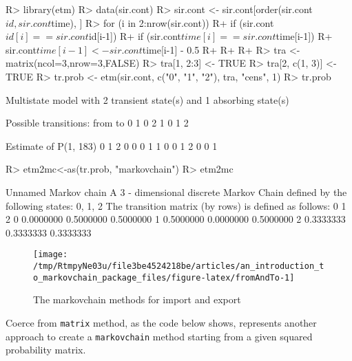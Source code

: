 \documentclass[article,nojss]{jss}
\begin{document}
\begin{CodeChunk}

\begin{CodeInput}
R> library(etm)
R> data(sir.cont)
R> sir.cont <- sir.cont[order(sir.cont$id, sir.cont$time), ]
R> for (i in 2:nrow(sir.cont)) {
R+   if (sir.cont$id[i]==sir.cont$id[i-1]) {
R+     if (sir.cont$time[i]==sir.cont$time[i-1]) {
R+       sir.cont$time[i-1] <- sir.cont$time[i-1] - 0.5
R+     }
R+   }
R+ }
R> tra <- matrix(ncol=3,nrow=3,FALSE)
R> tra[1, 2:3] <- TRUE
R> tra[2, c(1, 3)] <- TRUE
R> tr.prob <- etm(sir.cont, c("0", "1", "2"), tra, "cens", 1)
R> tr.prob
\end{CodeInput}

\begin{CodeOutput}
Multistate model with 2 transient state(s)
 and 1 absorbing state(s)

Possible transitions:
 from to
    0  1
    0  2
    1  0
    1  2

Estimate of P(1, 183)
  0 1 2
0 0 0 1
1 0 0 1
2 0 0 1
\end{CodeOutput}

\begin{CodeInput}
R> etm2mc<-as(tr.prob, "markovchain")
R> etm2mc
\end{CodeInput}

\begin{CodeOutput}
Unnamed Markov chain 
 A  3 - dimensional discrete Markov Chain defined by the following states: 
 0, 1, 2 
 The transition matrix  (by rows)  is defined as follows: 
          0         1         2
0 0.0000000 0.5000000 0.5000000
1 0.5000000 0.0000000 0.5000000
2 0.3333333 0.3333333 0.3333333
\end{CodeOutput}
\end{CodeChunk}

\begin{CodeChunk}
\begin{figure}

{\centering \texttt{[image: /tmp/RtmpyNe03u/file3be4524218be/articles/an\_introduction\_to\_markovchain\_package\_files/figure-latex/fromAndTo-1]} 

}

\caption[The markovchain methods for import and export]{The markovchain methods for import and export}\label{fig:fromAndTo}
\end{figure}
\end{CodeChunk}

Coerce from \texttt{matrix} method, as the code below shows, represents another approach to create a \texttt{markovchain} method starting from a given squared probability matrix.
\end{document}

